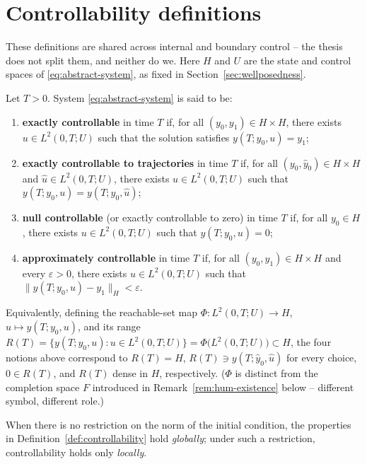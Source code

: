 \section{Controllability definitions}
\label{sec:definitions}

These definitions are shared across internal and boundary control -- the
thesis does not split them, and neither do we. Here $H$ and $U$ are the state
and control spaces of \eqref{eq:abstract-system}, as fixed in
Section~\ref{sec:wellposedness}.

\begin{definition}
  \label{def:controllability}
  Let $T > 0$. System \eqref{eq:abstract-system} is said to be:
  \begin{enumerate}[label=(\roman*)]
    \item \textbf{exactly controllable} in time $T$ if, for all
      $(y_0,y_1)\in H\times H$, there exists $u \in L^2(0,T;U)$ such that the
      solution satisfies $y(T;y_0,u) = y_1$;
    \item \textbf{exactly controllable to trajectories} in time $T$ if, for
      all $(y_0,\hat y_0)\in H\times H$ and $\hat u \in L^2(0,T;U)$, there
      exists $u \in L^2(0,T;U)$ such that
      $y(T;y_0,u) = y(T;\hat y_0,\hat u)$;
    \item \textbf{null controllable} (or exactly controllable to zero) in
      time $T$ if, for all $y_0 \in H$, there exists $u \in L^2(0,T;U)$ such
      that $y(T;y_0,u)=0$;
    \item \textbf{approximately controllable} in time $T$ if, for all
      $(y_0,y_1)\in H\times H$ and every $\varepsilon>0$, there exists
      $u \in L^2(0,T;U)$ such that $\|y(T;y_0,u)-y_1\|_H < \varepsilon$.
  \end{enumerate}
\end{definition}

Equivalently, defining the reachable-set map
$\Phi: L^2(0,T;U)\to H$, $u \mapsto y(T;y_0,u)$, and its range
$R(T) = \{y(T;y_0,u): u\in L^2(0,T;U)\} = \Phi\big(L^2(0,T;U)\big) \subset H$,
the four notions above correspond to
$R(T)=H$, $R(T) \ni y(T;\hat y_0,\hat u)$ for every choice, $0 \in R(T)$, and
$R(T)$ dense in $H$, respectively. ($\Phi$ is distinct from the completion
space $F$ introduced in Remark~\ref{rem:hum-existence} below -- different
symbol, different role.)

\begin{remark}
  When there is no restriction on the norm of the initial condition, the
  properties in Definition~\ref{def:controllability} hold \emph{globally};
  under such a restriction, controllability holds only \emph{locally}.
\end{remark}
